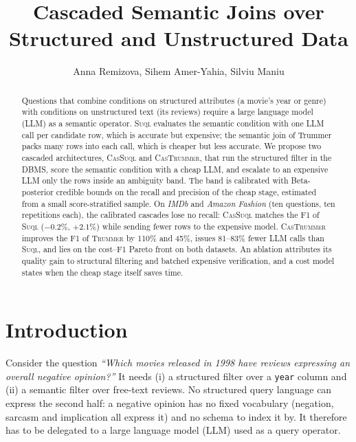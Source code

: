 \documentclass[sigconf]{acmart}
\begin{document}
\title{Cascaded Semantic Joins over Structured and Unstructured Data}

\author{Anna Remizova, Sihem Amer-Yahia, Silviu Maniu}

\begin{abstract}
Questions that combine conditions on structured attributes (a movie's year or genre) with conditions on unstructured text (its reviews) require a large language model (LLM) as a semantic operator. \textsc{Suql} evaluates the semantic condition with one LLM call per candidate row, which is accurate but expensive; the semantic join of Trummer packs many rows into each call, which is cheaper but less accurate. We propose two cascaded architectures, \textsc{CasSuql} and \textsc{CasTrummer}, that run the structured filter in the DBMS, score the semantic condition with a cheap LLM, and escalate to an expensive LLM only the rows inside an ambiguity band. The band is calibrated with Beta-posterior credible bounds on the recall and precision of the cheap stage, estimated from a small score-stratified sample. On \textit{IMDb} and \textit{Amazon Fashion} (ten questions, ten repetitions each), the calibrated cascades lose no recall: \textsc{CasSuql} matches the F1 of \textsc{Suql} ($-0.2\%$, $+2.1\%$) while sending fewer rows to the expensive model. \textsc{CasTrummer} improves the F1 of \textsc{Trummer} by 110\% and 45\%, issues 81--83\% fewer LLM calls than \textsc{Suql}, and lies on the cost--F1 Pareto front on both datasets. An ablation attributes its quality gain to structural filtering and batched expensive verification, and a cost model states when the cheap stage itself saves time.
\end{abstract}


\maketitle
\thispagestyle{firstpagestyle}

\section{Introduction}
\label{sec:intro}

Consider the question \emph{``Which movies released in 1998 have reviews expressing an overall negative opinion?''} It needs (i) a structured filter over a \texttt{year} column and (ii) a semantic filter over free-text reviews. No structured query language can express the second half: a negative opinion has no fixed vocabulary (negation, sarcasm and implication all express it) and no schema to index it by. It therefore has to be delegated to a large language model (LLM) used as a query operator.
\end{document}
